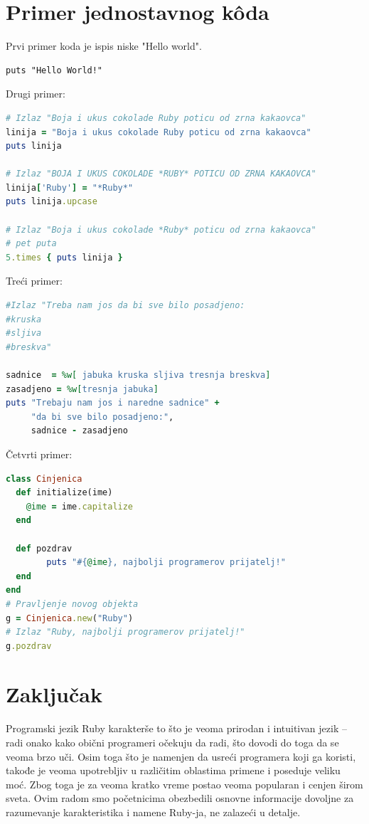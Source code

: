 \documentclass[a4paper]{article}
\begin{document}
\section{Primer jednostavnog k\^{o}da}
Prvi primer koda je ispis niske "Hello world".
\begin{lstlisting}[frame=single]
puts "Hello World!"
\end{lstlisting}\vspace*{-15pt}

Drugi primer:
\begin{lstlisting}[language=Ruby]
# Izlaz "Boja i ukus cokolade Ruby poticu od zrna kakaovca"
linija = "Boja i ukus cokolade Ruby poticu od zrna kakaovca"
puts linija

# Izlaz "BOJA I UKUS COKOLADE *RUBY* POTICU OD ZRNA KAKAOVCA"
linija['Ruby'] = "*Ruby*"
puts linija.upcase

# Izlaz "Boja i ukus cokolade *Ruby* poticu od zrna kakaovca"
# pet puta
5.times { puts linija }
\end{lstlisting}\vspace*{-15pt}

Treći primer:
\begin{lstlisting}[language=Ruby]
#Izlaz "Treba nam jos da bi sve bilo posadjeno:
#kruska
#sljiva
#breskva"

sadnice  = %w[ jabuka kruska sljiva tresnja breskva]
zasadjeno = %w[tresnja jabuka]
puts "Trebaju nam jos i naredne sadnice" +
     "da bi sve bilo posadjeno:",
     sadnice - zasadjeno
\end{lstlisting}\vspace*{-15pt}
Četvrti primer:
\begin{lstlisting}[language=Ruby]
class Cinjenica
  def initialize(ime)
    @ime = ime.capitalize
  end

  def pozdrav      
        puts "#{@ime}, najbolji programerov prijatelj!"
  end
end
# Pravljenje novog objekta
g = Cinjenica.new("Ruby")
# Izlaz "Ruby, najbolji programerov prijatelj!"
g.pozdrav
\end{lstlisting}

\section{Zaključak}
Programski jezik Ruby karakterše to što je veoma prirodan i intuitivan jezik – radi onako kako obični programeri očekuju da radi, što dovodi do toga da se veoma brzo uči. Osim toga što je namenjen da usreći programera koji ga koristi, takođe je veoma upotrebljiv u različitim oblastima primene i poseduje veliku moć. Zbog toga je za veoma kratko vreme postao veoma popularan i cenjen širom sveta. Ovim radom smo početnicima obezbedili osnovne informacije dovoljne za razumevanje karakteristika i namene Ruby-ja, ne zalazeći u detalje. 
\end{document}
